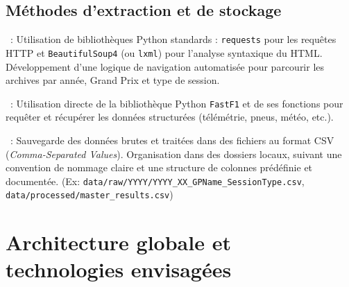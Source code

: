 \documentclass[11pt, a4paper]{article}
\begin{document}
\subsection{Méthodes d'extraction et de stockage}

\begin{description}[style=standard, itemsep=0.5em, labelwidth=!, leftmargin=1.5em, font=\normalfont]
    \item[\texttt{formula1.com} (Scraping)]~:
        \subitem Utilisation de bibliothèques Python standards : \texttt{requests} pour les requêtes HTTP et \texttt{BeautifulSoup4} (ou \texttt{lxml}) pour l'analyse syntaxique du HTML.
        \subitem Développement d'une logique de navigation automatisée pour parcourir les archives par année, Grand Prix et type de session.
    \item[\texttt{FastF1} (API Client)]~:
        \subitem Utilisation directe de la bibliothèque Python \texttt{FastF1} et de ses fonctions pour requêter et récupérer les données structurées (télémétrie, pneus, météo, etc.).
    \item[Stockage Initial]~:
        \subitem Sauvegarde des données brutes et traitées dans des fichiers au format CSV (\textit{Comma-Separated Values}).
        \subitem Organisation dans des dossiers locaux, suivant une convention de nommage claire et une structure de colonnes prédéfinie et documentée. (Ex: \texttt{data/raw/YYYY/YYYY\_XX\_GPName\_SessionType.csv}, \texttt{data/processed/master\_results.csv})
\end{description}

\section{Architecture globale et technologies envisagées}
\end{document}
